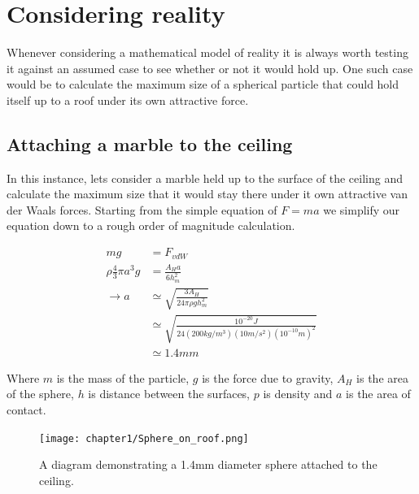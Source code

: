 
\section{Considering reality}

Whenever considering a mathematical model of reality it is always worth testing it against an assumed case to see whether or not it would hold up. One such case would be to calculate the maximum size of a spherical particle that could hold itself up to a roof under its own attractive force.

\subsection{Attaching a marble to the ceiling}

In this instance, lets consider a marble held up to the surface of the ceiling and calculate the maximum size that it would stay there under it own attractive van der Waals forces. Starting from the simple equation of $F = ma$ we simplify our equation down to a rough order of magnitude calculation.

\begin{equation*}
    \begin{split}
    mg &= F_{vdW} \\
    \rho \frac{4}{3} \pi a^3 g &= \frac{A_H a}{6 h_{m}^2} \\
    \rightarrow a &\simeq \sqrt{\frac{3 A_H}{24 \pi \rho g h_{m}^2}} \\ 
    &\simeq \sqrt{\frac{10^{-20}J}{24 (200kg/m^3) (10m/s^2) (10^{-10} m)^2 }} \\
    &\simeq 1.4mm
    \end{split}
\end{equation*}
\newpage

Where $m$ is the mass of the particle, $g$ is the force due to gravity, $A_H$ is the area of the sphere, $h$ is distance between the surfaces, $p$ is density and $a$ is the area of contact.

\begin{figure}[h]     %
        \begin{center}
          \texttt{[image: chapter1/Sphere\_on\_roof.png]}
\end{center}
\caption{A diagram demonstrating a 1.4mm diameter sphere attached to the ceiling.}
\label{fig:disp}                 %
\end{figure}

